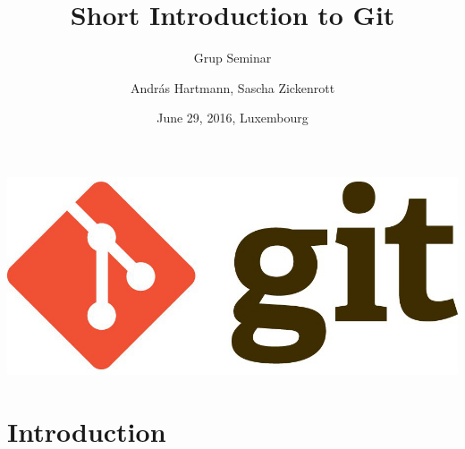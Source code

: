 \documentclass[10pt,xcolor=dvipsnames]{beamer}
\title{Short Introduction to Git}
\subtitle{Grup Seminar}
\author{Andr\'as Hartmann, Sascha Zickenrott}
\institute[LCSB]{
LCSB, Computational Biology group
  University of Luxembourg
}
\date[June 29, 2016]{June 29, 2016, Luxembourg}
\begin{document}
\begin{frame}
  \vspace{2.5em}
\begin{center}
    \includegraphics[height=0.2\textheight]{git-logo.jpg}
\end{center}
  \titlepage
\end{frame}


\section{Introduction}
\end{document}
